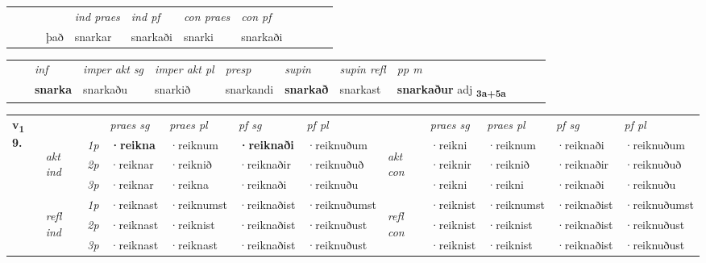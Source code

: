 \begin{tabular}{llllllllllll}
 & &  & &  \textit{ind praes} & \textit{ind pf} & \textit{con praes} & \textit{con pf} \\*
&  & & það & snarkar & snarkaði & snarki & snarkaði \\*
\cmidrule{5-9}
\end{tabular}


\begin{tabular}{llllllllllll}
 & & \textit{inf} & \textit{imper akt sg} & \textit{imper akt pl}   & \textit{presp} & \textit{supin} & \textit{supin refl} & \textit{pp m}     \\*
  & & \textbf{snarka} & snarkaðu  & snarkið   & snarkandi &  \textbf{snarkað} & snarkast & \textbf{snarkaður} adj \textbf{\textsubscript{3a+5a}} \\*
\cmidrule{1-12}
\end{tabular}



\begin{tabular}{llllllllllll} \toprule
\multirow{4}{*}{{{\textbf{v{\textsubscript{1}}} \Large{\textbf{9.}}}}}  & &   &  \textit{praes sg}  & \textit{praes pl}  &\textit{ pf sg} & \textit{pf pl} &  &  \textit{praes sg}  & \textit{praes pl}  & \textit{pf sg} & \textit{pf pl } \\*
	\cmidrule{4-7} \cmidrule{9-12}
 & \multirow{3}{*}{\begin{turn}{90}\textit{akt ind}\end{turn}} & {\textit{1p}} & \textbf{·reikna} & ·reiknum    & \textbf{·reiknaði} & ·reiknuðum & \multirow{3}{*}{\begin{turn}{90}\textit{akt con}\end{turn}} &·reikni & ·reiknum & ·reiknaði & ·reiknuðum\\*
& &  {\textit{2p}} &  ·reiknar  & ·reiknið   & ·reiknaðir & ·reiknuðuð & & ·reiknir & ·reiknið & ·reiknaðir & ·reiknuðuð \\*
& &  {\textit{3p}} & ·reiknar & ·reikna   & ·reiknaði & ·reiknuðu & & ·reikni & ·reikni& ·reiknaði & ·reiknuðu  \\*
\cmidrule{4-7} \cmidrule{9-12}
 &\multirow{3}{*}{\begin{turn}{90}\textit{refl ind}\end{turn}} & {\textit{1p}} & ·reiknast & ·reiknumst    & ·reiknaðist & ·reiknuðumst & \multirow{3}{*}{\begin{turn}{90}\textit{refl con}\end{turn}}  &·reiknist & ·reiknumst & ·reiknaðist & ·reiknuðumst\\*
 &&  {\textit{2p}} &  ·reiknast  & ·reiknist   & ·reiknaðist & ·reiknuðust & &·reiknist & ·reiknist & ·reiknaðist & ·reiknuðust \\*
& &  {\textit{3p}} & ·reiknast & ·reiknast   & ·reiknaðist & ·reiknuðust & & ·reiknist & ·reiknist& ·reiknaðist & ·reiknuðust  \\*
\cmidrule{4-7} \cmidrule{9-12}
\end{tabular}


